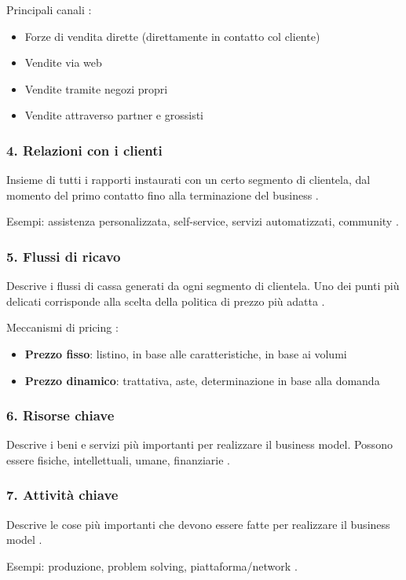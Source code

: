\documentclass[12pt,a4paper]{article}
\begin{document}
Principali canali :
\begin{itemize}
    \item Forze di vendita dirette (direttamente in contatto col cliente)
    \item Vendite via web
    \item Vendite tramite negozi propri
    \item Vendite attraverso partner e grossisti
\end{itemize}

\subsubsection{4. Relazioni con i clienti}
Insieme di tutti i rapporti instaurati con un certo segmento di clientela, dal momento del primo contatto fino alla terminazione del business .

Esempi: assistenza personalizzata, self-service, servizi automatizzati, community .

\subsubsection{5. Flussi di ricavo}
Descrive i flussi di cassa generati da ogni segmento di clientela. Uno dei punti più delicati corrisponde alla scelta della politica di prezzo più adatta .

Meccanismi di pricing :
\begin{itemize}
    \item \textbf{Prezzo fisso}: listino, in base alle caratteristiche, in base ai volumi
    \item \textbf{Prezzo dinamico}: trattativa, aste, determinazione in base alla domanda
\end{itemize}

\subsubsection{6. Risorse chiave}
Descrive i beni e servizi più importanti per realizzare il business model. Possono essere fisiche, intellettuali, umane, finanziarie .

\subsubsection{7. Attività chiave}
Descrive le cose più importanti che devono essere fatte per realizzare il business model .

Esempi: produzione, problem solving, piattaforma/network .
\end{document}
